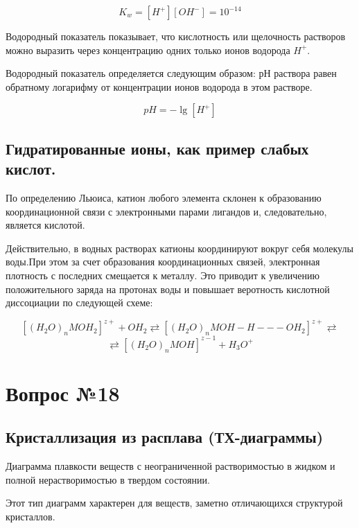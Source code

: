 \documentclass[14pt,a4paper]{scrartcl}
\begin{document}
$$K_w = \left[H^+\right]\left[OH^-\right] = 10^{-14}$$

Водородный показатель показывает, что кислотность или щелочность растворов можно выразить через концентрацию одних только ионов водорода $H^+$.

Водородный показатель определяется следующим образом: рН раствора равен обратному логарифму от концентрации ионов водорода в этом растворе.

$$pH = -\lg\left[H^+\right]$$

\subsection*{Гидратированные ионы, как пример слабых кислот.}


По определению Льюиса, катион любого элемента склонен к образованию координационной связи с электронными парами лигандов и, следовательно, является кислотой.

Действительно, в водных растворах катионы координируют вокруг себя молекулы воды.При этом за счет образования координационных связей, электронная плотность с последних смещается к металлу. Это приводит к увеличению положительного заряда на протонах воды и повышает веротность кислотной диссоциации по следующей схеме:

$$\left[(H_2O)_n MOH_2\right]^{z+} + OH_2 \rightleftarrows \left[(H_2O)_n MOH-H---OH_2\right]^{z+} \rightleftarrows $$
$$ \rightleftarrows  \left[(H_2O)_n MOH\right]^{z-1} + H_3O^+$$

\section*{Вопрос №18}
\subsection*{Кристаллизация из расплава (ТХ-диаграммы)}
Диаграмма плавкости веществ с неограниченной растворимостью в жидком и полной нерастворимостью в твердом состоянии.

Этот тип диаграмм характерен для веществ, заметно отличающихся структурой кристаллов.
\end{document}
